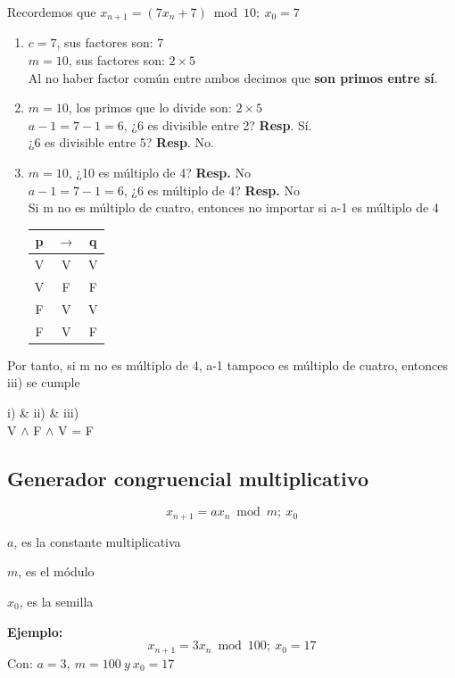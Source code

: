 \documentclass[11pt,letterpaper]{report}
\begin{document}
Recordemos que $x_{n+1} = (7x_n + 7) \bmod 10;\ x_0 = 7$
\begin{enumerate}[label=\roman*)]
\item $c = 7$, sus factores son: 7\\
$m = 10$, sus factores son: $2 \times 5$\\
Al no haber factor común entre ambos decimos que \textbf{son primos entre sí}.
\item $m = 10$, los primos que lo divide son: $2 \times 5$\\
$a - 1 = 7 - 1 = 6$, ¿6 es divisible entre 2? \textbf{Resp}. Sí.\\
\phantom{$a - 1 = 7 - 1 = 6$,} ¿6 es divisible entre 5? \textbf{Resp}. No.
\item $m = 10$, ¿10 es múltiplo de 4? \textbf{Resp.} No\\
$a - 1 = 7 - 1 = 6$, ¿6 es múltiplo de 4? \textbf{Resp.} No\\
Si m no es múltiplo de cuatro, entonces no importar si a-1 es múltiplo de 4

\begin{center}
\begin{tabular}{|c|c|c|}
\hline
\textbf{p} & $\rightarrow$ & \textbf{q}\\
\hline
V & V & V\\
V & F & F\\
F & V & V\\
F & V & F\\
\hline
\end{tabular}
\end{center}
\end{enumerate}

Por tanto, si m no es múltiplo de 4, a-1 tampoco es múltiplo de cuatro, entonces iii) se cumple
\begin{center}
i) \& ii) \& iii)\\
V $\wedge$ F $\wedge$ V = F
\end{center}

\subsection*{Generador congruencial multiplicativo}

\[
x_{n+1} = a x_n \bmod m;\ x_0
\]

$a$, es la constante multiplicativa

$m$, es el módulo

$x_0$, es la semilla

\textbf{Ejemplo:}
\[
x_{n+1} = 3x_n \bmod 100;\ x_0 = 17
\]
Con: $a = 3,\ m = 100\ y\ x_0 = 17$
\end{document}
